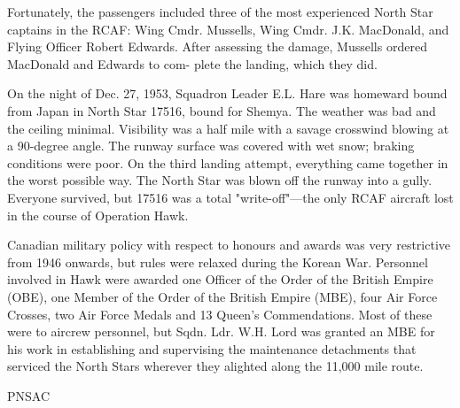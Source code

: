 Fortunately, the passengers included three of the most experienced
North Star captains in the RCAF: Wing Cmdr. Mussells, Wing
Cmdr. J.K. MacDonald, and Flying Officer Robert Edwards. After
assessing the damage, Mussells ordered MacDonald and Edwards to com-
plete the landing, which they did.

On the night of Dec. 27, 1953, Squadron Leader E.L. Hare was homeward
bound from Japan in North Star 17516, bound for Shemya. The weather
was bad and the ceiling minimal. Visibility was a half mile with a
savage crosswind blowing at a 90-degree angle. The runway surface was
covered with wet snow; braking conditions were poor. On the third
landing attempt, everything came together in the worst possible
way. The North Star was blown off the runway into a gully. Everyone
survived, but 17516 was a total "write-off"---the only RCAF aircraft
lost in the course of Operation Hawk.

Canadian military policy with respect to honours and awards was very
restrictive from 1946 onwards, but rules were relaxed during the
Korean War. Personnel involved in Hawk were awarded one Officer of the
Order of the British Empire (OBE), one Member of the Order of the
British Empire (MBE), four Air Force Crosses, two Air Force Medals and
13 Queen's Commendations. Most of these were to aircrew personnel, but
Sqdn. Ldr. W.H. Lord was granted an MBE for his work in establishing
and supervising the maintenance detachments that serviced the North
Stars wherever they alighted along the 11,000 mile route.

\begin{footnotesize}
    \raggedleft PNSAC\\
\end{footnotesize}



